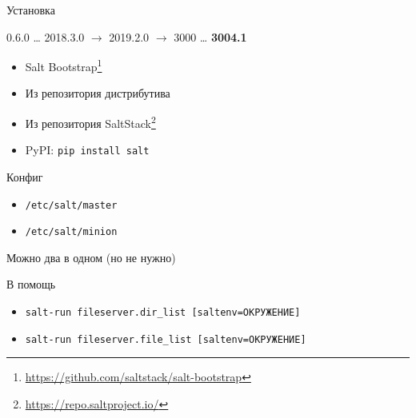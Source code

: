 ﻿

\begin{Frame}{Установка}


  \begin{center}
    0.6.0 \dots{} 2018.3.0 $\to$ 2019.2.0 $\to$ 3000 \dots{} \bfseries{3004.1}
  \end{center}

  \vfill

  \pause{}

  \begin{itemize}[<+-| alert@ +>]
    \item Salt Bootstrap\footnote{%
      \url{https://github.com/saltstack/salt-bootstrap}}
    \vfill
    \item Из репозитория дистрибутива
    \vfill
    \item Из репозитория SaltStack\footnote<3->{\url{https://repo.saltproject.io/}}
    \vfill
    \item PyPI: \texttt{pip install salt}
    \vfill
  \end{itemize}
\end{Frame}

\liveframe{}

\begin{Frame}{Конфиг}
  \begin{itemize}
    \item \texttt{/etc/salt/master} \ExampleIcon{}
    \item \texttt{/etc/salt/minion} \ExampleIcon{}
  \end{itemize}

  \vfill
  \pause{}

  \inlineicon{\faInfoCircle} Можно два в одном
  \pause{} (но не нужно)

  \vfill
  \pause{}

  \begin{block}{В помощь}
    \small
    \begin{itemize}
      \item \texttt{salt-run fileserver.dir\_list [saltenv=ОКРУЖЕНИЕ]}
      \item \texttt{salt-run fileserver.file\_list [saltenv=ОКРУЖЕНИЕ]}
    \end{itemize}
  \end{block}

\end{Frame}

